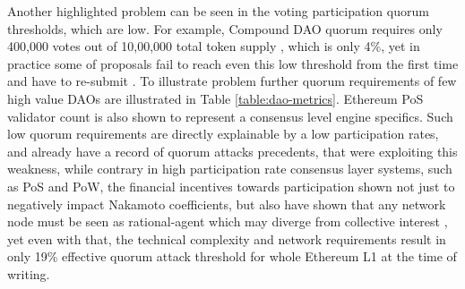 \documentclass{article}
\begin{document}
\begin{CJK}{UTF8}{gbsn}
\begin{multicols}{2}
        Another highlighted problem can be seen in the voting participation quorum thresholds, which are low. For example, Compound DAO quorum requires only 400,000 \cite{CompDAO} votes out of 10,00,000 total token supply \cite{CompToken}, which is only 4\%, yet in practice some of proposals fail to reach even this low threshold from the first time and have to re-submit \cite{CompProp232}\cite{CompProp237}. To illustrate problem further quorum requirements of few high value DAOs are illustrated in Table \ref*{table:dao-metrics}. Ethereum PoS validator count is also shown to represent a consensus level engine specifics. Such low quorum requirements are directly explainable by a low participation rates, and already have a record of quorum attacks \cite{AragonBlog}\cite{rhizoo2023} precedents, that were exploiting this weakness, while contrary in high participation rate consensus layer systems, such as PoS and PoW, the financial incentives towards participation shown not just to negatively impact  Nakamoto coefficients, but also have shown that any network node must be seen as rational-agent which may diverge from collective interest \cite{Philip2019}, yet even with that, the technical complexity and network requirements result in only 19\% effective quorum attack threshold for whole Ethereum L1 at the time of writing.
        

\end{multicols}
\end{CJK}
\end{document}
